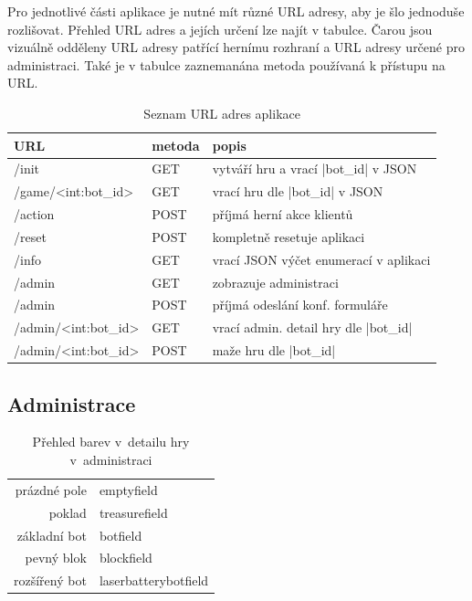 Pro jednotlivé části aplikace je nutné mít různé URL adresy, aby je šlo jednoduše rozlišovat. Přehled URL adres a jejích určení lze najít v tabulce. Čarou jsou vizuálně odděleny URL adresy patřící hernímu rozhraní a URL adresy určené pro administraci. Také je v tabulce zaznemanána metoda používaná k přístupu na URL.
{
\captionsetup{belowskip=-5pt,aboveskip=0pt}
\begin{table}[H]
	\caption{Seznam URL adres aplikace}
	\label{table:urls}
	\centering
	\begin{tabular}{ B | B | p{37.5ex} }
		URL & metoda & popis \\
		\hline
		/init & GET & vytváří hru a vrací \ic|bot_id| v JSON \\
		/game/<int:bot_id> & GET & vrací hru dle \ic|bot_id| v JSON \\
		/action & POST & příjmá herní akce klientů \\
		/reset & POST & kompletně resetuje aplikaci \\
		/info & GET & vrací JSON výčet enumerací v aplikaci \\
		\hline
		/admin & GET & zobrazuje administraci \\
		/admin & POST & příjmá odeslání konf. formuláře \\
		/admin/<int:bot_id> & GET & vrací admin. detail hry dle \ic|bot_id| \\
		/admin/<int:bot_id> & POST & maže hru dle \ic|bot_id| \\
	\end{tabular}
\end{table}
}

\subsection{Administrace}

\begin{table}
	\caption{Přehled barev v~detailu hry v~administraci}
	\label{table:game-detail-colors}
	\newcommand{\colpic}[1]{\tikz \draw[#1,fill=#1,draw](0,0)circle(7.5pt);}
	\vspace{-10pt}
	\begin{flushright}
		\begin{tabular}{ r | M }
			prázdné pole & emptyfield \\
			poklad & treasurefield \\
			základní bot & botfield \\
			pevný blok & blockfield \\
			rozšířený bot & laserbatterybotfield \\
		\end{tabular}
	\end{flushright}
\end{table}


